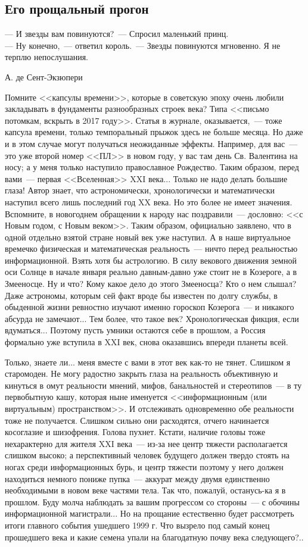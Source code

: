 \documentclass{scrbook}
\makeatletter
\newcommand{\defaultepigraphwidth}{0.5} %
\newcommand{\flqq}{<<}
\newcommand{\frqq}{>>}
\newcommand{\mdash}{~--- }
\newcommand{\sdash}{--- } %
\newcommand{\commamdash}{~--- } %
\newcommand{\essaysection}[1]{\subsection*{#1}\nopagebreak}
\newcommand{\myepigraph}[3][\@empty]{
	\ifx\@empty#1
		\setlength{\epigraphwidth}{\defaultepigraphwidth\textwidth}
	\else
		\setlength{\epigraphwidth}{#1\textwidth}
	\fi
	\epigraph{#2}{#3}
	\setlength{\epigraphwidth}{\defaultepigraphwidth\textwidth} %
	\nopagebreak
}
\makeatother
\begin{document}
\essaysection{Его прощальный прогон}

\myepigraph{{\sdash} И звезды вам повинуются?{\mdash}Спросил маленький принц. \\
{\sdash} Ну конечно,{\commamdash}ответил король.{\mdash}Звезды повинуются мгновенно. Я не терплю непослушания.}
{А. де Сент-Экзюпери}

Помните {\flqq}капсулы времени{\frqq}, которые в советскую эпоху очень любили закладывать в фундаменты разнообразных строек века? Типа {\flqq}письмо потомкам, вскрыть в 2017 году{\frqq}. Статья в журнале, оказывается,{\commamdash}тоже капсула времени, только темпоральный прыжок здесь не больше месяца. Но даже и в этом случае могут получаться неожиданные эффекты. Например, для вас{\mdash}это уже второй номер {\flqq}ПЛ{\frqq} в новом году, у вас там день Св. Валентина на носу; а у меня только наступило православное Рождество. Таким образом, перед вами{\mdash}первая {\flqq}Вселенная{\frqq} XXI века... Только не надо делать большие глаза! Автор знает, что астрономически, хронологически и математически наступил всего лишь последний год XX века. Но это более не имеет значения. Вспомните, в новогоднем обращении к народу нас поздравили{\mdash}дословно: {\flqq}с Новым годом, с Новым веком{\frqq}. Таким образом, официально заявлено, что в одной отдельно взятой стране новый век уже наступил. А в наше виртуальное времечко физическая и математическая реальность{\mdash}ничто перед реальностью информационной. Взять хотя бы астрологию. В силу векового движения земной оси Солнце в начале января реально давным-давно уже стоит не в Козероге, а в Змееносце. Ну и что? Кому какое дело до этого Змееносца? Кто о нем слышал? Даже астрономы, которым сей факт вроде бы известен по долгу службы, в обыденной жизни ревностно изучают именно гороскоп Козерога{\mdash}и никакого абсурда не замечают... Тем более, что такое век? Хронологическая фикция, если вдуматься... Поэтому пусть умники остаются себе в прошлом, а Россия формально уже вступила в XXI век, снова оказавшись впереди планеты всей.

Только, знаете ли... меня вместе с вами в этот век как-то не тянет. Слишком я старомоден. Не могу радостно закрыть глаза на реальность объективную и кинуться в омут реальности мнений, мифов, банальностей и стереотипов{\mdash}в ту первобытную кашу, которая ныне именуется {\flqq}информационным (или виртуальным) пространством{\frqq}. И отслеживать одновременно обе реальности тоже не получается. Слишком сильно они расходятся, отчего начинается косоглазие и шизофрения. Голова пухнет. Кстати, наличие головы тоже нехарактерно для жителя XXI века{\mdash}из-за нее центр тяжести располагается слишком высоко; а перспективный человек будущего должен твердо стоять на ногах среди информационных бурь, и центр тяжести поэтому у него должен находиться немного пониже пупка{\mdash}аккурат между двумя единственно необходимыми в новом веке частями тела. Так что, пожалуй, останусь-ка я в прошлом. Буду молча наблюдать за вашим прогрессом со стороны{\mdash}с обочины информационной магистрали... Но на прощание естественно будет рассмотреть итоги главного события ушедшего 1999 г. Что вызрело под самый конец прошедшего века и какие семена упали на благодатную почву века следующего?..
\end{document}
